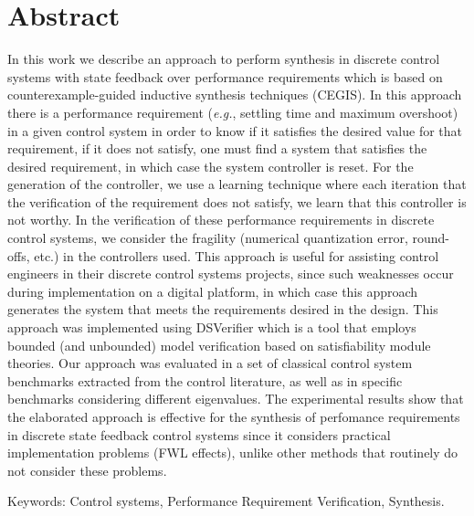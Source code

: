 \chapter*{Abstract}
\thispagestyle{empty}

In this work we describe an approach to perform synthesis in discrete control systems with state feedback over performance requirements which is based on counterexample-guided inductive synthesis techniques (CEGIS). In this approach there is a performance requirement (\textit{e.g.}, settling time and maximum overshoot) in a given control system in order to know if it satisfies the desired value for that requirement, if it does not satisfy, one must find a system that satisfies the desired requirement, in which case the system controller is reset. For the generation of the controller, we use a learning technique where each iteration that the verification of the requirement does not satisfy, we learn that this controller is not worthy. In the verification of these performance requirements in discrete control systems, we consider the fragility (numerical quantization error, round-offs, etc.) in the controllers used. This approach is useful for assisting control engineers in their discrete control systems projects, since such weaknesses occur during implementation on a digital platform, in which case this approach generates the system that meets the requirements desired in the design. This approach was implemented using DSVerifier which is a tool that employs bounded (and unbounded) model verification based on satisfiability module theories. Our approach was evaluated in a set of classical control system benchmarks extracted from the control literature, as well as in specific benchmarks considering different eigenvalues. The experimental results show that the elaborated approach is effective for the synthesis of perfomance requirements in discrete state feedback control systems since it considers practical implementation problems (FWL effects), unlike other methods that routinely do not consider these problems.


\noindent \textsf{Keywords:} Control systems, Performance Requirement Verification, Synthesis.

\cleardoublepage
